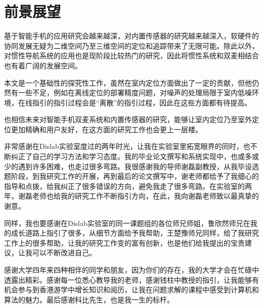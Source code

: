 \documentclass[winfonts]{njuthesis}
\begin{document}
	\section{前景展望}
	
		基于智能手机的应用研究会越来越深，对内置传感器的研究越来越深入，软硬件的协同发展无疑为二维空间乃至三维空间的定位和追踪带来了无限可能。除此以外，对惯性导航系统的应用也是现阶段比较热门的研究，因此将惯性系统和双麦相结合也有着广阔的发展空间。
		
		本文是一个基础性的探究性工作，虽然在室内定位方面做出了一定的贡献，但他仍然有一些不足，例如在离线定位的部署精度问题，对噪声的处理局限于室内低噪环境，在线指引的指引过程会是“离散”的指引过程，因此在这些方面都有待提高。
		
		也相信未来对智能手机双麦系统和内置传感器的研究，能够让室内定位乃至室外定位更加精确和用户友好，在这方面的研究工作也会更上一层楼。
	
	

	\begin{acknowledgement}
		
		非常感谢在Dislab实验室度过的两年时光，让我在实验室里拓宽眼界的同时，也不断纠正了自己的学习方法和学习态度。我的毕业论文撰写和系统实现中，也或多或少的遇到许多困难，也走过很多弯路。我很感谢我的导师谢磊副教授，从我毕设选题阶段，到我研究工作的开展，再到最后的论文撰写中，谢老师都给予了我细心的指导和点拨，给我纠正了很多错误的方向，避免我走了很多弯路。在实验室的两年，谢磊老师也给我的研究工作不断指引方向，在此，我向谢磊老师致以最真挚的谢意。
		
		同样，我也要感谢在Dislab实验室的同一课题组的各位师兄师姐，鲁欣然师兄在我的成长道路上指引了很多，从细节方面给予我帮助，王楚豫师兄同样，给了我研究工作上的很多帮助，让我的研究工作变的富有创新，也是他们给我提出的宝贵建议，让我可以不断改进自己。
		
		感谢大学四年来四种相伴的同学和朋友，因为你们的存在，我的大学才会在忙碌中透露出精彩。感谢每一位悉心教导我的老师，感谢钱柱中教授的指引，让我能够有机会参与到香港游学中增长知识和阅历，让我在问题求解的课程中感受到计算机和算法的魅力。最后感谢科比先生，也是我一生的标杆。
		
	\end{acknowledgement}
\end{document}
